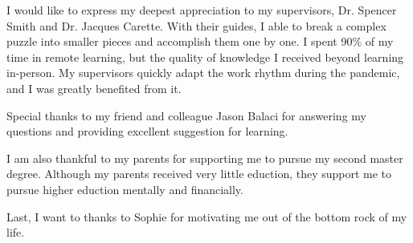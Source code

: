 
I would like to express my deepest appreciation to my supervisors, Dr. Spencer Smith and Dr. Jacques Carette. With their guides, I able to break a complex puzzle into smaller pieces and accomplish them one by one. I spent 90\% of my time in remote learning, but the quality of knowledge I received beyond learning in-person. My supervisors quickly adapt the work rhythm during the pandemic, and I was greatly benefited from it.


Special thanks to my friend and colleague Jason Balaci for answering my questions and providing excellent suggestion for learning.


I am also thankful to my parents for supporting me to pursue my second master degree. Although my parents received very little eduction, they support me to pursue higher eduction mentally and financially.

Last, I want to thanks to Sophie for motivating me out of the bottom rock of my life. 